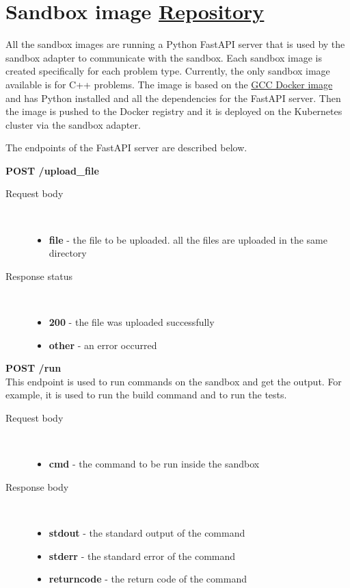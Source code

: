 \documentclass[12pt,a4paper]{report}
\begin{document}
\section{Sandbox image \href{https://github.com/acadnet-dev/sandbox-cpp}{ Repository}}
All the sandbox images are running a Python FastAPI server that is used by the sandbox adapter to communicate with the sandbox.
Each sandbox image is created specifically for each problem type. Currently, the only sandbox image available is for C++ problems.
The image is based on the \href{https://hub.docker.com/_/gcc}{GCC Docker image} and has Python installed and all the dependencies for the FastAPI server.
Then the image is pushed to the Docker registry and it is deployed on the Kubernetes cluster via the sandbox adapter.

The endpoints of the FastAPI server are described below.

\textbf{POST /upload\_file}
\begin{description}
	\item[Request body]\
		\begin{itemize}
			\item \textbf{file} - the file to be uploaded. all the files are uploaded in the same directory
		\end{itemize}
	\item[Response status]\
		\begin{itemize}
			\item \textbf{200} - the file was uploaded successfully
			\item \textbf{other} - an error occurred
		\end{itemize}
\end{description}


\textbf{POST /run}\\
This endpoint is used to run commands on the sandbox and get the output. For example, it is used to run the build command and to run the tests.
\begin{description}
	\item[Request body]\
		\begin{itemize}
			\item \textbf{cmd} - the command to be run inside the sandbox
		\end{itemize}
	\item[Response body]\
		\begin{itemize}
			\item \textbf{stdout} - the standard output of the command
			\item \textbf{stderr} - the standard error of the command
			\item \textbf{returncode} - the return code of the command
		\end{itemize}
\end{description}
\end{document}
